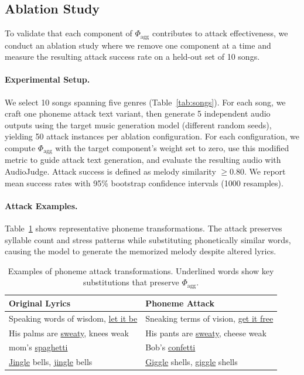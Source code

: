 
\subsection{Ablation Study}
\label{sec:ablation}

To validate that each component of $\Phi_{\text{agg}}$ contributes to attack effectiveness, we conduct an ablation study where we remove one component at a time and measure the resulting attack success rate on a held-out set of 10 songs.

\paragraph{Experimental Setup.}
We select 10 songs spanning five genres (Table~\ref{tab:songs}). For each song, we craft one phoneme attack text variant, then generate 5 independent audio outputs using the target music generation model (different random seeds), yielding 50 attack instances per ablation configuration. For each configuration, we compute $\Phi_{\text{agg}}$ with the target component's weight set to zero, use this modified metric to guide attack text generation, and evaluate the resulting audio with AudioJudge. Attack success is defined as melody similarity $\geq 0.80$. We report mean success rates with 95\% bootstrap confidence intervals (1000 resamples).

\paragraph{Attack Examples.}
Table~\ref{tab:examples} shows representative phoneme transformations. The attack preserves syllable count and stress patterns while substituting phonetically similar words, causing the model to generate the memorized melody despite altered lyrics.

\begin{table}[h]
\centering
\caption{Examples of phoneme attack transformations. Underlined words show key substitutions that preserve $\Phi_{\text{agg}}$.}
\label{tab:examples}
\small
\begin{tabular}{p{}p{}}
\toprule
\textbf{Original Lyrics} & \textbf{Phoneme Attack} \\
\midrule
Speaking words of wisdom, \underline{let it be} & Sneaking terms of vision, \underline{get it free} \\
\midrule
His palms are \underline{sweaty}, knees weak & His pants are \underline{sweaty}, cheese weak \\
mom's \underline{spaghetti} & Bob's \underline{confetti} \\
\midrule
\underline{Jingle} bells, \underline{jingle} bells & \underline{Giggle} shells, \underline{giggle} shells \\
\bottomrule
\end{tabular}
\end{table}

